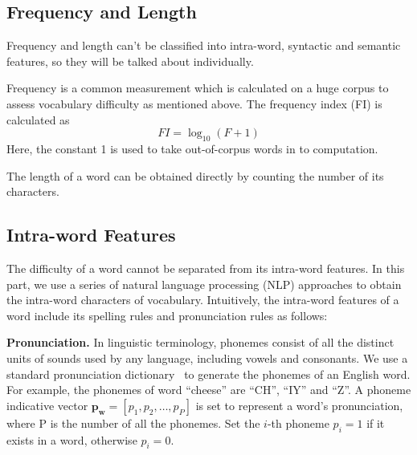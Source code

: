 \subsection{Frequency and Length}
Frequency and length can't be classified into intra-word, syntactic and semantic features, so they will be talked about individually.

Frequency is a common measurement which is calculated on a huge corpus to assess vocabulary difficulty as mentioned above.
	The frequency index (FI) is calculated as \begin{equation}
	FI=\log_{10}(F+1)
	\end{equation}  Here, the constant 1 is used to take out-of-corpus words in to computation.
	
The length of a word can be obtained directly by counting the number of its characters.

\subsection{Intra-word Features}
The difficulty of a word cannot be separated from its intra-word features.
In this part, we use a series of natural language processing (NLP) approaches to obtain the intra-word characters of vocabulary. 
Intuitively, the intra-word features of a word include its spelling rules and pronunciation rules as follows:

\textbf{Pronunciation.} 
In linguistic terminology, phonemes consist of all the distinct units of sounds used by any language, including vowels and consonants.
We use a standard pronunciation dictionary~\cite{John2004CMU}
to generate the phonemes of an English word.
For example, the phonemes of word ``cheese'' are ``CH'', ``IY'' and ``Z''.
A phoneme indicative vector $\mathbf{p_w}=[p_1, p_2, \dots, p_P]$ is set to represent a word's pronunciation, where P is the number of all the phonemes. Set the $i$-th phoneme $p_i=1$ if it exists in a word, otherwise $p_i=0$.

